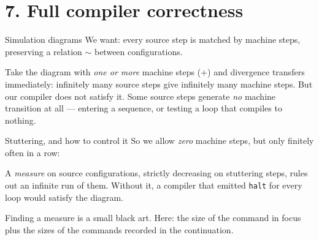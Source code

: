 \documentclass[aspectratio=169,10pt]{beamer}
\newcommand{\code}[1]{\texttt{\small #1}}
\begin{document}
\section{7. Full compiler correctness}

\begin{frame}{Simulation diagrams}
We want: every source step is matched by machine steps, preserving a relation
$\sim$ between configurations.
\medskip
\begin{center}
\end{center}
\medskip

Take the diagram with \emph{one or more} machine steps ($+$) and divergence
transfers immediately: infinitely many source steps give infinitely many
machine steps.
\medskip
\pause
But our compiler does not satisfy it.  Some source steps generate \emph{no}
machine transition at all --- entering a sequence, or testing a loop that
compiles to nothing.
\end{frame}

\begin{frame}{Stuttering, and how to control it}
So we allow \emph{zero} machine steps, but only finitely often in a row:
\begin{center}
\end{center}
\medskip

A \emph{measure} on source configurations, strictly decreasing on stuttering
steps, rules out an infinite run of them.  Without it, a compiler that
emitted \code{halt} for every loop would satisfy the diagram.
\medskip

Finding a measure is a small black art.  Here: the size of the command in
focus plus the sizes of the commands recorded in the continuation.
\end{frame}
\end{document}
